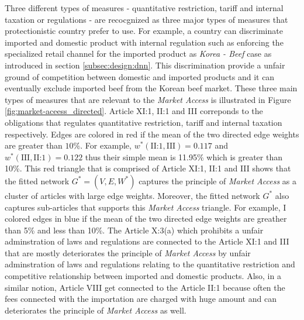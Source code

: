 Three different types of measures - quantitative restriction, tariff and internal taxation or regulations - are recocgnized as 
three major types of measures that protectionistic country prefer to use. For example, a country can
discriminate imported and domestic product with internal regulation such as enforcing the specialized retail channel for the imported product as \textit{Korea - Beef} case as introduced in section \ref{subsec:design:dnn}.
This discrimination provide a unfair ground of competition between domestic and imported products and it can eventually exclude imported beef from the Korean beef market.
These three main types of measures that are relevant to the \textit{Market Access} is illustrated in Figure \ref{fig:market-aceess_directed}.
Article XI:1, II:1 and III correponds to the obligations that regulates quantitative restriction, tariff and internal taxation respectively.
Edges are colored in red if the mean of the two directed edge weights are greater than $10\%$. For example, $w^*(\text{II:1}, \text{III}) = 0.117$ and $w^*(\text{III}, \text{II:1}) = 0.122$ thus their simple mean is 11.95\% which is greater than 10\%.
This red triangle that is comprised of Article XI:1, II:1 and III shows that the fitted network $G^* = (V, E, W^*)$ captures the principle of \textit{Market Access} as a cluster of articles with large edge weights. Moreover, 
the fitted network $G^*$ also captures sub-articles that supports this \textit{Market Access} triangle. For example, I colored edges in blue if the mean of the two directed edge weights are greather than 5\% and less than 10\%.
The Article X:3(a) which prohibits a unfair adminstration of laws and regulations are connected to the Article XI:1 and III that are mostly 
deteriorates the principle of \textit{Market Access} by unfair adminstration of laws and regulations relating to the quantitative restriction 
and competitive relationship between imported and domestic products. Also, in a similar notion, Article VIII get connected to the Article II:1 because 
often the fees connected with the importation are charged with huge amount and can deteriorates the principle of \textit{Market Access} as well.





